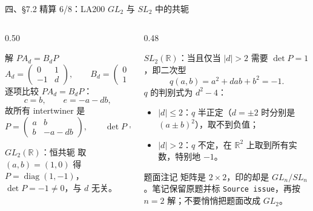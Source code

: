 \documentclass[aspectratio=169,10pt,fontset=none]{ctexbeamer}
\begin{document}
\begin{frame}[t]{四、\S7.2 精算 6/8：LA200 $GL_2$ 与 $SL_2$ 中的共轭}
  \begin{columns}[T,onlytextwidth]
    \begin{column}{0.50\textwidth}
      \begin{block}{\footnotesize 解 $PA_d=B_dP$}
        \scriptsize
        \[ A_d=\begin{pmatrix}0&1\\-1&d\end{pmatrix},\qquad B_d=\begin{pmatrix}0&-1\\1&d\end{pmatrix},\qquad P=\begin{pmatrix}a&b\\c&e\end{pmatrix}. \]
        逐项比较 $PA_d=B_dP$：
        \[ c=b,\qquad e=-a-db, \]
        故所有 intertwiner 是
        \[ P=\begin{pmatrix}a&b\\b&-a-db\end{pmatrix},\qquad \det P=-(a^2+dab+b^2). \]
      \end{block}
      \begin{exampleblock}{\footnotesize $GL_2(\mathbb R)$：恒共轭}
        \scriptsize
        取 $(a,b)=(1,0)$ 得 $P=\operatorname{diag}(1,-1)$，$\det P=-1\ne0$，与 $d$ 无关。
      \end{exampleblock}
    \end{column}
    \begin{column}{0.48\textwidth}
      \begin{alertblock}{\footnotesize $SL_2(\mathbb R)$：当且仅当 $|d|>2$}
        \scriptsize
        需要 $\det P=1$，即二次型
        \[ q(a,b)=a^2+dab+b^2=-1. \]
        $q$ 的判别式为 $d^2-4$：
        \begin{itemize}\setlength{\itemsep}{1pt}
          \item $|d|\le2$：$q$ 半正定（$d=\pm2$ 时分别是 $(a\pm b)^2$），取不到负值；
          \item $|d|>2$：$q$ 不定，在 $\mathbb R^2$ 上取到所有实数，特别地 $-1$。
        \end{itemize}
      \end{alertblock}
      \begin{alertblock}{\footnotesize 题面注记}
        \scriptsize
        矩阵是 $2\times2$，印的却是 $GL_n/SL_n$。笔记保留原题并标 \texttt{Source issue}，再按 $n=2$ 解；不要悄悄把题面改成 $GL_2$。
      \end{alertblock}
    \end{column}
  \end{columns}
\end{frame}
\end{document}
